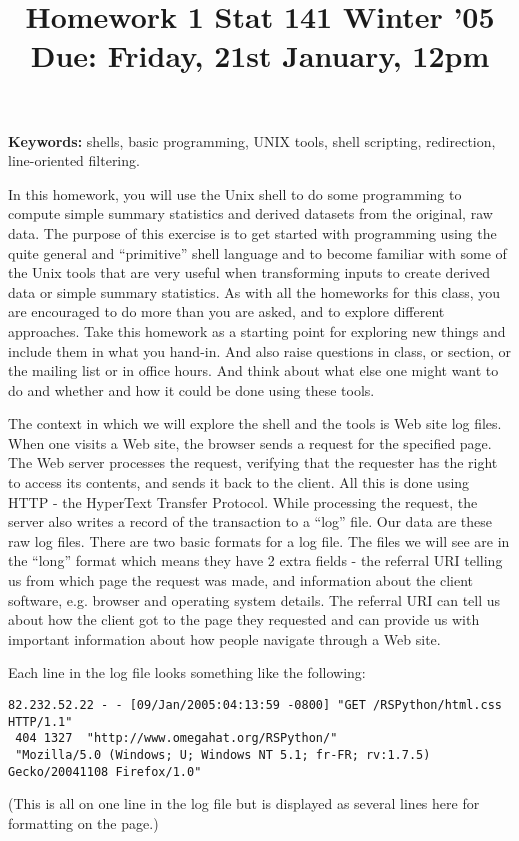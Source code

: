 \documentclass[12pt]{article}
\title{Homework 1 \hfill Stat 141 Winter '05 \\
Due:  Friday, 21st January, 12pm 
}
\begin{document}
\maketitle{}

\textbf{Keywords:} shells, basic programming, UNIX tools, shell
scripting, redirection, line-oriented filtering.

In this homework, you will use the Unix shell to do some programming
to compute simple summary statistics and
derived datasets from the original, raw data.  The purpose of
this exercise is to get started with programming using the quite
general and ``primitive'' shell language and to become familiar with some of the
Unix tools that are very useful when transforming inputs to create
derived data or simple summary statistics.  As with all the homeworks for this class, you are
encouraged to do more than you are asked, and to explore different
approaches. Take this homework as a starting point for exploring new
things and include them in what you hand-in. And also raise questions
in class, or section, or the mailing list or in office hours. And think about what else one
might want to do and whether and how it could be done using these tools.


The context in which we will explore the shell and the tools is Web site log files.
When one visits a Web site, the browser sends a request for the
specified page.  The Web server processes the request, verifying that
the requester has the right to access its contents, and sends it back
to the client.  All this is done using HTTP - the HyperText Transfer
Protocol.  While processing the request, the server also writes a
record of the transaction to a ``log'' file.  Our data are these
raw log files.
There are two basic formats for a log file.
The files we will see are in the ``long'' format which means they
have 2 extra fields - the referral URI telling us from which page
the request was made,  and information about the 
client software, e.g. browser and operating system details.
The referral URI can tell us about how the client got to the page
they requested  and can provide us with important information about 
how people navigate through a Web site.


Each line in the log file looks something like the following:
\small{
\begin{verbatim}
82.232.52.22 - - [09/Jan/2005:04:13:59 -0800] "GET /RSPython/html.css HTTP/1.1" 
 404 1327  "http://www.omegahat.org/RSPython/"
 "Mozilla/5.0 (Windows; U; Windows NT 5.1; fr-FR; rv:1.7.5) Gecko/20041108 Firefox/1.0"
\end{verbatim}
}
(\small{This is all on one line in the log file but is displayed as
  several lines here for formatting on the page.})
\end{document}
